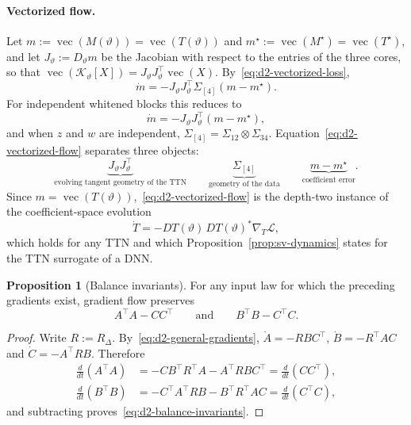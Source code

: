 \documentclass[11pt]{article}
\newcommand{\vect}{\operatorname{vec}}
\theoremstyle{definition}
\newtheorem{proposition}[theorem]{Proposition}
\numberwithin{equation}{section}
\begin{document}
\paragraph{Vectorized flow.}
Let $m:=\vect(M(\vartheta))=\vect(T(\vartheta))$ and $m^\star:=\vect(M^\star)=\vect(T^\star)$, and let $J_\vartheta:=D_\vartheta m$ be the Jacobian with respect to the entries of the three cores, so that $\vect(\mathcal K_\vartheta[X])=J_\vartheta J_\vartheta^\top\vect(X)$. By~\eqref{eq:d2-vectorized-loss},
\begin{equation}\label{eq:d2-vectorized-flow}
\dot m=-J_\vartheta J_\vartheta^\top\Sigma_{[4]}(m-m^\star).
\end{equation}
For independent whitened blocks this reduces to
\begin{equation}\label{eq:d2-vectorized-flow-white}
\dot m=-J_\vartheta J_\vartheta^\top(m-m^\star),
\end{equation}
and when $z$ and $w$ are independent, $\Sigma_{[4]}=\Sigma_{12}\otimes\Sigma_{34}$. Equation~\eqref{eq:d2-vectorized-flow} separates three objects:
\[
\underbrace{J_\vartheta J_\vartheta^\top}_{\text{evolving tangent geometry of the TTN}}\qquad\underbrace{\Sigma_{[4]}}_{\text{geometry of the data}}\qquad\underbrace{m-m^\star}_{\text{coefficient error}}.
\]
Since $m=\vect(T(\vartheta))$,~\eqref{eq:d2-vectorized-flow} is the depth-two instance of the coefficient-space evolution
\[
\dot T=-DT(\vartheta)\,DT(\vartheta)^*\nabla_T\mathcal L,
\]
which holds for any TTN and which Proposition~\ref{prop:sv-dynamics} states for the TTN surrogate of a DNN.

\begin{proposition}[Balance invariants]\label{prop:d2-balance}
For any input law for which the preceding gradients exist, gradient flow preserves
\begin{equation}\label{eq:d2-balance-invariants}
A^\top A-CC^\top\qquad\text{and}\qquad B^\top B-C^\top C.
\end{equation}
\end{proposition}

\begin{proof}
Write $R:=R_\Delta$. By~\eqref{eq:d2-general-gradients}, $\dot A=-RBC^\top$, $\dot B=-R^\top AC$ and $\dot C=-A^\top RB$. Therefore
\begin{align*}
\tfrac{d}{dt}(A^\top A)&=-CB^\top R^\top A-A^\top RBC^\top=\tfrac{d}{dt}(CC^\top),\\
\tfrac{d}{dt}(B^\top B)&=-C^\top A^\top RB-B^\top R^\top AC=\tfrac{d}{dt}(C^\top C),
\end{align*}
and subtracting proves~\eqref{eq:d2-balance-invariants}.
\end{proof}
\end{document}
